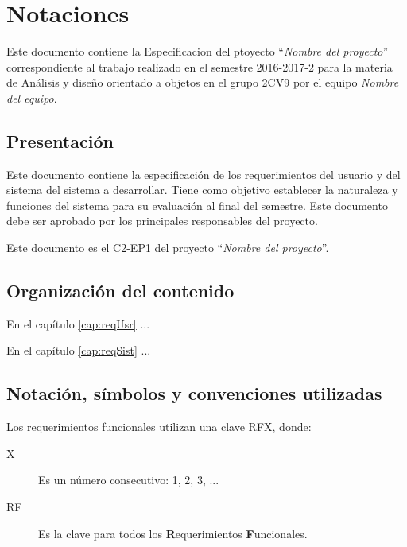 \section{Notaciones }


	Este documento contiene la Especificacion del ptoyecto ``{\em Nombre del proyecto}'' correspondiente al trabajo realizado en el semestre 2016-2017-2 para la materia de Análisis y diseño orientado a objetos en el grupo 2CV9 por el equipo {\em Nombre del equipo}.

\subsection{Presentación}


	Este documento contiene la especificación de los requerimientos del usuario y del sistema del sistema a desarrollar. Tiene como objetivo establecer la naturaleza y funciones del sistema para su evaluación al final del semestre. Este documento debe ser aprobado por los principales responsables del proyecto.
	
	Este documento es el C2-EP1 del proyecto ``{\em Nombre del proyecto}''.
	
\subsection{Organización del contenido}

	En el capítulo \ref{cap:reqUsr} ...
	
	En el capítulo \ref{cap:reqSist} ...

\subsection{Notación, símbolos y convenciones utilizadas}

	Los requerimientos funcionales utilizan una clave RFX, donde:
	
\begin{description}
	\item[X] Es un número consecutivo: 1, 2, 3, ...
	\item[RF] Es la clave para todos los {\bf R}equerimientos {\bf F}uncionales.
\end{description}

